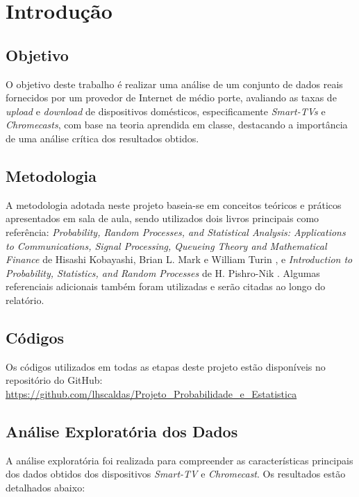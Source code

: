 \section{Introdução}

\subsection{Objetivo}

O objetivo deste trabalho é realizar uma análise de um conjunto de dados reais fornecidos por um provedor de Internet de médio porte, avaliando as taxas de \textit{upload} e \textit{download} de dispositivos domésticos, especificamente \textit{Smart-TVs} e \textit{Chromecasts}, com base na teoria aprendida em classe, destacando a importância de uma análise crítica dos resultados obtidos.

\subsection{Metodologia}

A metodologia adotada neste projeto baseia-se em conceitos teóricos e práticos apresentados em sala de aula, sendo utilizados dois livros principais como referência: \textit{Probability, Random Processes, and Statistical Analysis: Applications to Communications, Signal Processing, Queueing Theory and Mathematical Finance} de Hisashi Kobayashi, Brian L. Mark e William Turin \cite{Kobayashi_2011}, e \textit{Introduction to Probability, Statistics, and Random Processes} de H. Pishro-Nik \cite{Pishro_2014}. Algumas referenciais adicionais também foram utilizadas e serão citadas ao longo do relatório.

\subsection{Códigos}

Os códigos utilizados em todas as etapas deste projeto estão disponíveis no repositório do GitHub: \url{https://github.com/lhscaldas/Projeto_Probabilidade_e_Estatistica}

\subsection{Análise Exploratória dos Dados}\label{sec:eda}

A análise exploratória foi realizada para compreender as características principais dos dados obtidos dos dispositivos \textit{Smart-TV} e \textit{Chromecast}. Os resultados estão detalhados abaixo:

